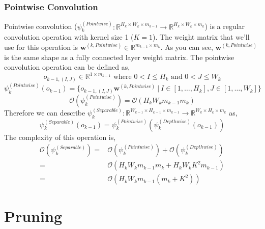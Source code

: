 \subsubsection{Pointwise Convolution}
Pointwise convolution ($\psi^{(Pointwise)}_k : \mathbb{R}^{H_k \times W_k \times m_{k-1}} \rightarrow \mathbb{R}^{H_k \times W_k \times m_{k}}$) is a regular convolution operation with kernel size 1 ($K = 1$). The weight matrix that we'll use for this operation is $\mathbf{w}^{(k, Pointwise)} \in \mathbb{R}^{ m_{k-1} \times m_k}$. As you can see, $\mathbf{w}^{(k, Pointwise)}$ is the same shape as  a fully connected layer weight matrix. The pointwise convolution operation can be defined as,
$$ o_{k-1, (I,J)} \in \mathbb{R}^{1 \times m_{k-1}} \text{ where }  0 < I \leq H_k \text{ and } 0 < J \leq W_k $$
$$ \psi^{(Pointwise)}_k(o_{k-1}) = \{ o_{k-1, (I,J)} \mathbf{w}^{(k, Pointwise)} \ | \ I \in [1, \ldots, H_k], J \in [1, \ldots, W_k]\} $$
$$ \mathcal{O} (\psi_k^{(Pointwise)}) = \mathcal{O} ( H_kW_km_{k-1}m_k)$$
Therefore we can describe $\psi^{(Separable)}_k : \mathbb{R}^{W_{k-1} \times H_{k-1} \times m_{k-1}} \rightarrow \mathbb{R}^{W_{k} \times H_{k} \times m_{k}}$ as,
$$ \psi^{(Separable)}_k(o_{k-1}) = \psi^{(Pointwise)}_k ( \psi^{(Depthwise)}_k(o_{k-1}) ) $$
The complexity of this operation is, 
\begin{equation*}
\begin{split}
	\mathcal{O}(\psi^{(Separable)}_k) =&  \mathcal{O} (\psi^{(Pointwise)}_k) + \mathcal{O} (\psi^{(Depthwise)}_k) \\
							    =& \mathcal{O} (H_kW_km_{k-1}m_k + H_kW_kK^2m_{k-1}) \\
							    =& \mathcal{O} (H_kW_km_{k-1}(m_k + K^2))
\end{split}
 \end{equation*}

\section{Pruning}

